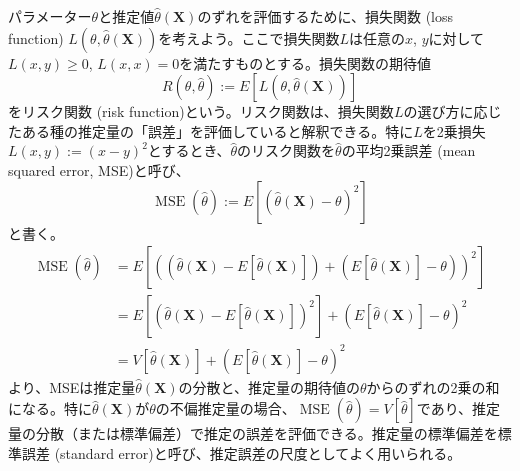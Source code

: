 \documentclass[uplatex,dvipdfmx]{jlreq}
\newcommand\term[1]{\textsf{#1}}
\begin{document}
パラメーター$\theta$と推定値$\hat{\theta}(\boldsymbol{X})$のずれを評価するために、\term{損失関数 (loss function)} $L(\theta, \hat{\theta}(\boldsymbol{X}))$を考えよう。ここで損失関数$L$は任意の$x$, $y$に対して$L(x, y) \geq 0$, $L(x, x) = 0$を満たすものとする。損失関数の期待値
\begin{equation}
    R(\theta, \hat{\theta}) := E[L(\theta, \hat{\theta}(\boldsymbol{X}))]
\end{equation}
を\term{リスク関数 (risk function)}という。リスク関数は、損失関数$L$の選び方に応じたある種の推定量の「誤差」を評価していると解釈できる。特に$L$を2乗損失$L(x, y):=(x-y)^2$とするとき、$\hat{\theta}$のリスク関数を$\hat{\theta}$の\term{平均2乗誤差 (mean squared error, MSE)}と呼び、
\begin{equation}
    \operatorname{MSE}(\hat{\theta}) := E[(\hat{\theta}(\boldsymbol{X}) - \theta)^2]
\end{equation}
と書く。
\begin{equation}
    \begin{split}
    \operatorname{MSE}(\hat{\theta})
    &= E\left[\left(
        (\hat{\theta}(\boldsymbol{X}) - E[\hat{\theta}(\boldsymbol{X})]) +
        (E[\hat{\theta}(\boldsymbol{X})] - \theta)
    \right)^2\right] \\
    &= E[(\hat{\theta}(\boldsymbol{X}) - E[\hat{\theta}(\boldsymbol{X})])^2] +
    (E[\hat{\theta}(\boldsymbol{X})] - \theta)^2 \\
    &= V[\hat{\theta}(\boldsymbol{X})] +
    (E[\hat{\theta}(\boldsymbol{X})] - \theta)^2
    \end{split}
\end{equation}
より、MSEは推定量$\hat{\theta}(\boldsymbol{X})$の分散と、推定量の期待値の$\theta$からのずれの2乗の和になる。特に$\hat{\theta}(\boldsymbol{X})$が$\theta$の不偏推定量の場合、$\operatorname{MSE}(\hat{\theta}) = V[\hat{\theta}]$であり、推定量の分散（または標準偏差）で推定の誤差を評価できる。推定量の標準偏差を\term{標準誤差 (standard error)}と呼び、推定誤差の尺度としてよく用いられる。
\end{document}
